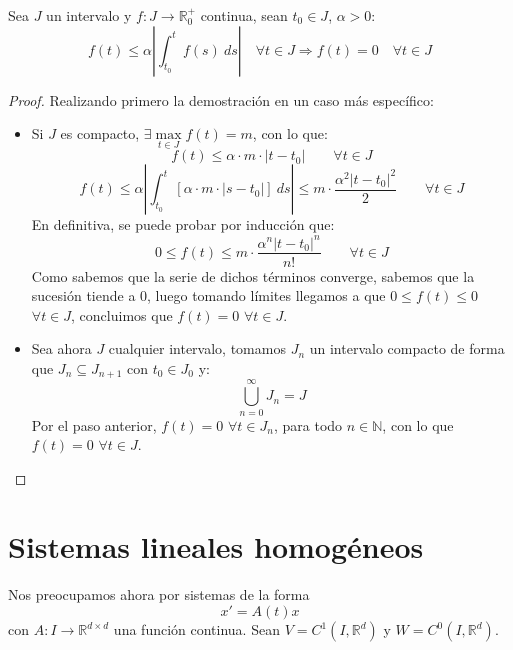 \begin{lema}\label{lema:unicidad_teo}
    Sea $J$ un intervalo y $f:J\rightarrow \mathbb{R}^+_0$ continua, sean $t_0\in J$, $\alpha >0$:
    \begin{equation*}
        f(t) \leq \alpha\left|\int_{t_0}^{t} f(s)~ds \right| \quad \forall t\in J \Longrightarrow f(t) = 0 \quad \forall t\in J
    \end{equation*}
    \begin{proof}
        Realizando primero la demostración en un caso más específico:
        \begin{itemize}
            \item Si $J$ es compacto, $\exists \max\limits_{t\in J} f(t) = m$, con lo que:
                \begin{equation*}
                    f(t) \leq \alpha \cdot m\cdot  |t-t_0| \qquad \forall t\in J
                \end{equation*}
                \begin{equation*}
                    f(t) \leq \alpha \left|\int_{t_0}^{t} [\alpha \cdot m\cdot  |s-t_0|]~ds \right| \leq m\cdot  \dfrac{\alpha^2 {|t-t_0|}^{2}}{2}\qquad \forall t\in J
                \end{equation*}
                En definitiva, se puede probar por inducción que:
                \begin{equation*}
                    0\leq f(t) \leq m\cdot  \dfrac{\alpha^n {|t-t_0|}^{n}}{n!} \qquad \forall t\in J
                \end{equation*}
                Como sabemos que la serie de dichos términos converge, sabemos que la sucesión tiende a 0, luego tomando límites llegamos a que $0\leq f(t) \leq 0$ $\forall t\in J$, concluimos que $f(t) = 0$ $\forall t\in J$.
            \item Sea ahora $J$ cualquier intervalo, tomamos $J_n$ un intervalo compacto de forma que $J_n \subseteq J_{n+1}$ con $t_0 \in J_0$ y:
                \begin{equation*}
                    \bigcup_{n=0}^\infty J_n = J
                \end{equation*}
                Por el paso anterior, $f(t) = 0$ $\forall t\in J_n$, para todo $n\in \mathbb{N}$, con lo que $f(t) = 0$ $\forall t\in J$.
        \end{itemize}
    \end{proof}
\end{lema}

\section{Sistemas lineales homogéneos}
\noindent
Nos preocupamos ahora por sistemas de la forma
\begin{equation}\label{eq:lin_sup_h}
    x' = A(t) x
\end{equation}
con $A:I\rightarrow\mathbb{R}^{d\times d}$ una función continua. Sean $V = C^1(I,\mathbb{R}^d)$ y $W=C^0(I,\mathbb{R}^d)$.


